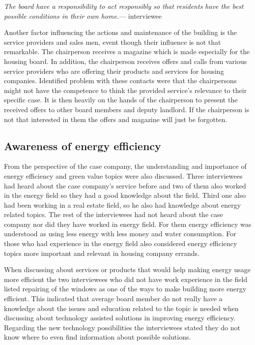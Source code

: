 \begin{displayquote}
\textit{The board have a responsibility to act responsibly so that residents have the best possible conditions in their own home.}--- interviewee
\end{displayquote}

Another factor influencing the actions and maintenance of the building is the service providers and sales men, event though their influence is not that remarkable. The chairperson receives a magazine which is made especially for the housing board. In addition, the chairperson receives offers and calls from various service providers who are offering their products and services for housing companies. Identified problem with these contacts were that the chairpersons might not have the competence to think the provided service's relevance to their specific case. It is then heavily on the hands of the chairperson to present the received offers to other board members and deputy landlord. If the chairperson is not that interested in them the offers and magazine will just be forgotten.

\subsection{Awareness of energy efficiency}

From the perspective of the case company, the understanding and importance of  energy efficiency and green value topics were also discussed. Three interviewees had heard about the case company's service before and two of them also worked in the energy field so they had a good knowledge about the field. Third one also had been working in a real estate field, so he also had knowledge about energy related topics. The rest of the interviewees had not heard about the case company nor did they have worked in energy field. For them energy efficiency was understood as using less energy with less money and water consumption. For those who had experience in the energy field also considered energy efficiency topics more important and relevant in housing company errands.

When discussing about services or products that would help making energy usage more efficient the two interviewees who did not have work experience in the field listed repairing of the windows as one of the ways to make building more energy efficient. This indicated that average board member do not really have a knowledge about the issues and education related to the topic is needed when discussing about technology assisted solutions in improving energy efficiency. Regarding the new technology possibilities the interviewees stated they do not know where to even find information about possible solutions.

